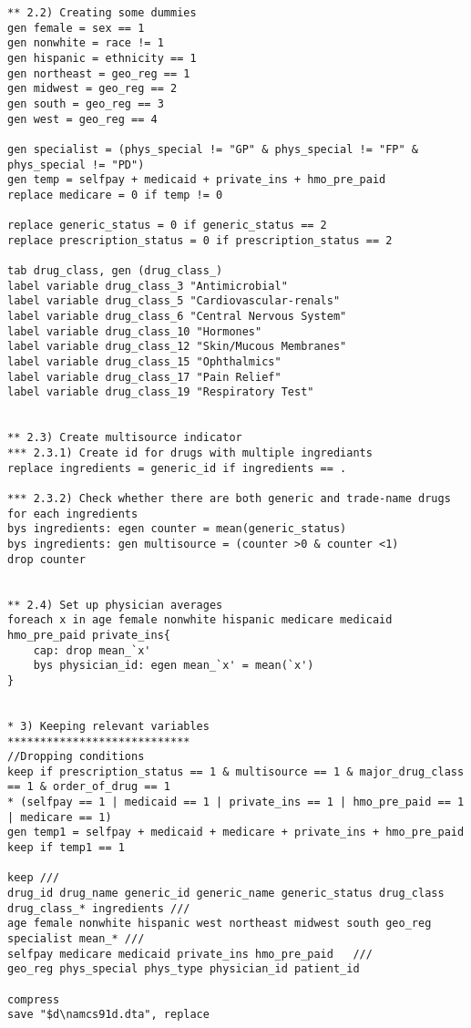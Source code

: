 \documentclass[
]{book}
\begin{document}
\begin{verbatim}
** 2.2) Creating some dummies
gen female = sex == 1
gen nonwhite = race != 1
gen hispanic = ethnicity == 1
gen northeast = geo_reg == 1
gen midwest = geo_reg == 2
gen south = geo_reg == 3
gen west = geo_reg == 4

gen specialist = (phys_special != "GP" & phys_special != "FP" & phys_special != "PD") 
gen temp = selfpay + medicaid + private_ins + hmo_pre_paid
replace medicare = 0 if temp != 0

replace generic_status = 0 if generic_status == 2
replace prescription_status = 0 if prescription_status == 2

tab drug_class, gen (drug_class_)
label variable drug_class_3 "Antimicrobial"
label variable drug_class_5 "Cardiovascular-renals"
label variable drug_class_6 "Central Nervous System"
label variable drug_class_10 "Hormones"
label variable drug_class_12 "Skin/Mucous Membranes"
label variable drug_class_15 "Ophthalmics"
label variable drug_class_17 "Pain Relief"
label variable drug_class_19 "Respiratory Test"


** 2.3) Create multisource indicator
*** 2.3.1) Create id for drugs with multiple ingrediants
replace ingredients = generic_id if ingredients == .

*** 2.3.2) Check whether there are both generic and trade-name drugs for each ingredients
bys ingredients: egen counter = mean(generic_status) 
bys ingredients: gen multisource = (counter >0 & counter <1)
drop counter


** 2.4) Set up physician averages
foreach x in age female nonwhite hispanic medicare medicaid hmo_pre_paid private_ins{
    cap: drop mean_`x'
    bys physician_id: egen mean_`x' = mean(`x')
}


* 3) Keeping relevant variables
****************************
//Dropping conditions
keep if prescription_status == 1 & multisource == 1 & major_drug_class == 1 & order_of_drug == 1  
* (selfpay == 1 | medicaid == 1 | private_ins == 1 | hmo_pre_paid == 1 | medicare == 1)
gen temp1 = selfpay + medicaid + medicare + private_ins + hmo_pre_paid
keep if temp1 == 1

keep ///
drug_id drug_name generic_id generic_name generic_status drug_class drug_class_* ingredients ///
age female nonwhite hispanic west northeast midwest south geo_reg specialist mean_* /// 
selfpay medicare medicaid private_ins hmo_pre_paid   ///
geo_reg phys_special phys_type physician_id patient_id

compress
save "$d\namcs91d.dta", replace
\end{verbatim}
\end{document}
